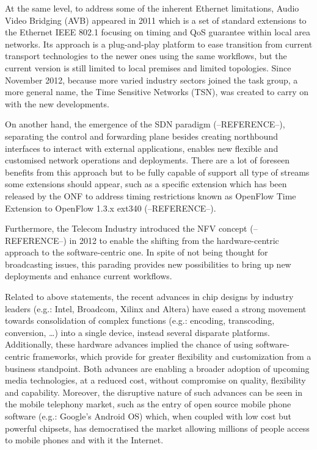 At the same level, to address some of the inherent Ethernet limitations, Audio Video Bridging (AVB) appeared in 2011 which is a set of standard extensions to the Ethernet IEEE 802.1 focusing on timing and QoS guarantee within local area networks. Its approach is a plug-and-play platform to ease transition from current transport technologies to the newer ones using the same workflows, but the current version is still limited to local premises and limited topologies. Since November 2012, because more varied industry sectors joined the task group, a more general name, the Time Sensitive Networks (TSN), was created to carry on with the new developments.

On another hand, the emergence of the SDN paradigm (--REFERENCE--), separating the control and forwarding plane besides creating northbound interfaces to interact with external applications, enables new flexible and customised network operations and deployments. There are a lot of foreseen benefits from this approach but to be fully capable of support all type of streams some extensions should appear, such as a specific extension which has been released by the ONF to address timing restrictions known as OpenFlow Time Extension to OpenFlow 1.3.x ext340 (--REFERENCE--).

Furthermore, the Telecom Industry introduced the NFV concept (--REFERENCE--) in 2012 to enable the shifting from the hardware-centric approach to the software-centric one. In spite of not being thought for
broadcasting issues, this parading provides new possibilities to bring up new deployments and  enhance current workflows.

Related to above statements, the recent advances in chip designs by industry leaders (e.g.: Intel, Broadcom, Xilinx and Altera) have eased a strong movement towards consolidation of complex functions (e.g.: encoding, transcoding, conversion, \ldots ) into a single device, instead
several disparate platforms. Additionally, these hardware advances implied the chance of using software-centric frameworks, which provide for greater flexibility and customization from a business standpoint. Both advances are enabling a broader adoption of upcoming media technologies, at a reduced cost, without compromise on quality, flexibility and capability. Moreover, the disruptive nature of such advances can be seen in the mobile telephony market, such as the entry of open source mobile phone software (e.g.: Google’s Android OS) which, when coupled with low cost but powerful chipsets, has democratised the market allowing millions of people access to mobile phones and with it the Internet.

